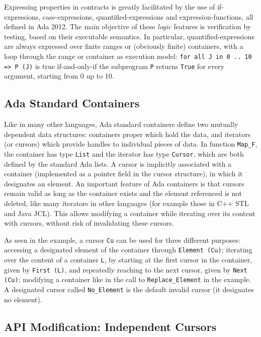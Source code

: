 \documentclass[runningheads,a4paper]{llncs}
\newcommand{\beforesub}{\vspace{-0.2cm}}
\newcommand{\aftersub}{\vspace{-0.1cm}}
\begin{document}
Expressing properties in contracts is greatly facilitated by the use of
if-expressions, case-expressions, quantified-expressions and expression-functions, 
all defined in Ada 2012. The main objective of these \emph{logic} features is
verification by testing, based on their executable semantics.
In particular, quantified-expressions are always
expressed over finite ranges or (obviously finite) containers, with a loop
through the range or container as execution model:
\verb|for all J in 0 .. 10 => P (J)| is true if-and-only-if the subprogram
\verb|P| returns \verb|True| for every argument, starting from 0 up to 10.

\beforesub
\subsection{Ada Standard Containers}
\aftersub

Like in many other languages, Ada standard containers define two mutually
dependent data structures: containers proper which hold the data, and iterators
(or cursors) which provide handles to individual pieces of data. In function
\verb|Map_F|, the container has type \verb|List| and the iterator has type
\verb|Cursor|, which are both defined by the standard Ada lists. A cursor is
implicitly associated with a container (implemented as a pointer field in the
cursor structure), in which it designates an element. An important feature of Ada
containers is that cursors remain valid as long as the container
exists and the element referenced is not deleted, like
many iterators in other languages (for example those in C++ STL and Java JCL).
This allows modifying a container while iterating over its content with
cursors, without risk of invalidating these cursors.

\ifdefined\longversion
As seen in the example, a cursor \verb|Cu| can be used for three different purposes:
accessing a designated element of the container through \verb|Element (Cu)|;
iterating over the content of a container \verb|L|,
by starting at the first cursor in the container, given by \verb|First (L)|,
and repeatedly reaching to the next cursor, given by \verb|Next (Cu)|;
modifying a container like in the call to \verb|Replace_Element| in the example.
A designated cursor called \verb|No_Element| is the default invalid cursor (it
designates no element).
\fi

\beforesub
\subsection{API Modification: Independent Cursors}
\label{sec:independent-cursor}
\aftersub
\end{document}
